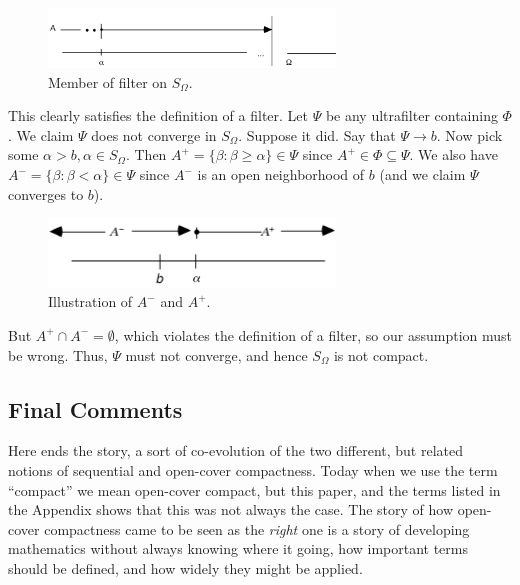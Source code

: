 \documentclass[12pt]{article}
\begin{document}
\begin{figure}[h]
\label{fig8}
  \begin{center}
   \includegraphics[width=3in]{A_in_phi.pdf}
  \end{center}
  \caption{Member of filter on $S_\Omega$.}
  \end{figure}
This clearly satisfies the definition of a filter. Let $\Psi$ be any ultrafilter
containing $\Phi$. We claim $\Psi$ does not converge in $S_\Omega$. Suppose it did. 
Say that $\Psi \rightarrow b$. Now pick some $\alpha > b, \alpha \in S_\Omega$. 
Then $A^+ = \{\beta:\beta \geq \alpha\} \in \Psi$  since $A^+ \in \Phi \subseteq
\Psi$. We also have $A^- = \{\beta:\beta < \alpha\} \in \Psi$ since $A^-$  is an open
neighborhood of $b$ (and we claim $\Psi$ converges to $b$).  

\begin{figure}[h]
\label{fig9}
  \begin{center}
   \includegraphics[width=3in]{A-,A+.pdf}
  \end{center}
  \caption{Illustration of $A^-$ and $A^+$.}
  \end{figure}
But $A^+ \cap A^- = \emptyset$, which violates the definition of a filter, so our
assumption must be wrong. Thus, $\Psi$ must not converge, and hence $S_\Omega$  is not
compact.


\subsection{Final Comments}
Here ends the story, a sort of co-evolution of the two different, but related notions of sequential and open-cover compactness. Today when we use the term ``compact'' we mean open-cover compact, but this paper, and the terms listed in the Appendix shows that this was not always the case. The story of how open-cover compactness came to be seen as the {\em right} one is a story of developing mathematics without always knowing where it going, how important terms should be defined, and how widely they might be applied. 
\end{document}
